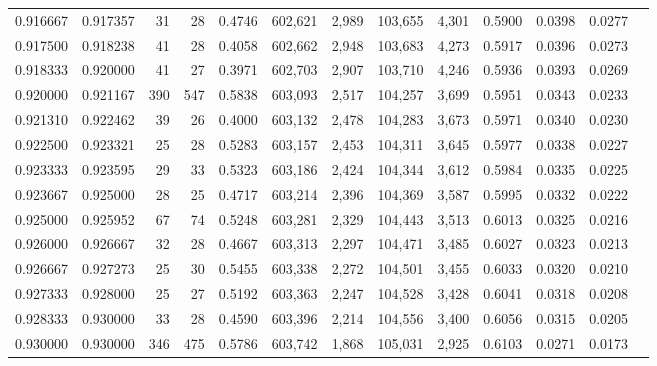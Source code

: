 \begin{tabular}{rrrrrrrrrrrrr}
0.916667 & 0.917357 &    31 &  28 &                                     0.4746 & 602,621 &   2,989 & 103,655 &   4,301 & 0.5900 & 0.0398 & 0.0277 \\
0.917500 & 0.918238 &    41 &  28 &                                     0.4058 & 602,662 &   2,948 & 103,683 &   4,273 & 0.5917 & 0.0396 & 0.0273 \\
0.918333 & 0.920000 &    41 &  27 &                                     0.3971 & 602,703 &   2,907 & 103,710 &   4,246 & 0.5936 & 0.0393 & 0.0269 \\
0.920000 & 0.921167 &   390 & 547 &                                     0.5838 & 603,093 &   2,517 & 104,257 &   3,699 & 0.5951 & 0.0343 & 0.0233 \\
0.921310 & 0.922462 &    39 &  26 &                                     0.4000 & 603,132 &   2,478 & 104,283 &   3,673 & 0.5971 & 0.0340 & 0.0230 \\
0.922500 & 0.923321 &    25 &  28 &                                     0.5283 & 603,157 &   2,453 & 104,311 &   3,645 & 0.5977 & 0.0338 & 0.0227 \\
0.923333 & 0.923595 &    29 &  33 &                                     0.5323 & 603,186 &   2,424 & 104,344 &   3,612 & 0.5984 & 0.0335 & 0.0225 \\
0.923667 & 0.925000 &    28 &  25 &                                     0.4717 & 603,214 &   2,396 & 104,369 &   3,587 & 0.5995 & 0.0332 & 0.0222 \\
0.925000 & 0.925952 &    67 &  74 &                                     0.5248 & 603,281 &   2,329 & 104,443 &   3,513 & 0.6013 & 0.0325 & 0.0216 \\
0.926000 & 0.926667 &    32 &  28 &                                     0.4667 & 603,313 &   2,297 & 104,471 &   3,485 & 0.6027 & 0.0323 & 0.0213 \\
0.926667 & 0.927273 &    25 &  30 &                                     0.5455 & 603,338 &   2,272 & 104,501 &   3,455 & 0.6033 & 0.0320 & 0.0210 \\
0.927333 & 0.928000 &    25 &  27 &                                     0.5192 & 603,363 &   2,247 & 104,528 &   3,428 & 0.6041 & 0.0318 & 0.0208 \\
0.928333 & 0.930000 &    33 &  28 &                                     0.4590 & 603,396 &   2,214 & 104,556 &   3,400 & 0.6056 & 0.0315 & 0.0205 \\
0.930000 & 0.930000 &   346 & 475 &                                     0.5786 & 603,742 &   1,868 & 105,031 &   2,925 & 0.6103 & 0.0271 & 0.0173 \\

\end{tabular}
